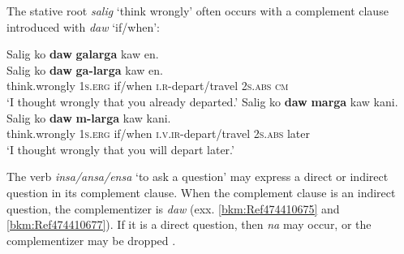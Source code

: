 The stative root \textit{salig} ‘think wrongly’ often occurs with a complement clause introduced with \textit{daw} ‘if/when’:

\ea
Salig  ko  \textbf{daw}  \textbf{galarga}  kaw  en. \smallskip\\
\gll Salig  ko  \textbf{daw}  \textbf{ga-larga}  kaw  en. \\
think.wrongly  1\textsc{s.erg}  if/when  \textsc{i.r}-depart/travel  2\textsc{s.abs}  \textsc{cm} \\
\glt ‘I thought wrongly that you already departed.’
\z
\ea
Salig  ko  \textbf{daw}  \textbf{marga}  kaw  kani. \smallskip\\
\gll Salig  ko  \textbf{daw}  \textbf{m-larga}  kaw  kani. \\
think.wrongly  1\textsc{s.erg}  if/when  \textsc{i.v.ir}-depart/travel  2\textsc{s.abs}  later \\
\glt ‘I thought wrongly that you will depart later.’
\z

The verb \textit{insa/ansa/ensa} ‘to ask a question’ may express a direct or indirect question in its complement clause. When the complement clause is an indirect question, the complementizer is \textit{daw} (exx. \ref{bkm:Ref474410675} and \ref{bkm:Ref474410677}). If it is a direct question, then \textit{na} may occur, or the complementizer may be dropped .

